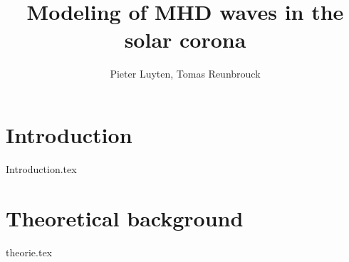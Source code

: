 \documentclass[a4paper]{article}
\title{Modeling of MHD waves in the solar corona}
\author{Pieter Luyten, Tomas Reunbrouck}
\begin{document}
\maketitle
\newpage
\tableofcontents
\newpage

\section{Introduction}
{Introduction.tex}
\cite{notes-fluid-dynamics}



\section{Theoretical background}
{theorie.tex}

\end{document}
